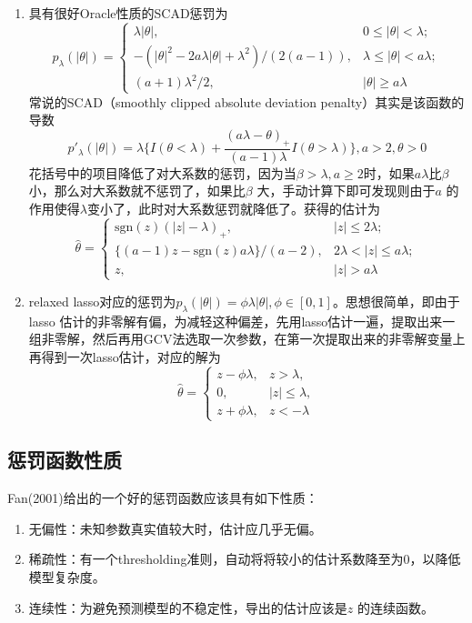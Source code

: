 ﻿\documentclass[hyperref,12pt]{ctexart}
\begin{document}
\begin{enumerate}[(1)]
	\item 具有很好Oracle性质的SCAD惩罚为
	\[
	p_{\lambda}(|\theta|) = \left\{\begin{array}{lr}
	\lambda|\theta|, & 0 \leq |\theta| < \lambda; \\
	-(|\theta|^2 - 2a\lambda|\theta| + \lambda^2)/(2(a - 1)), & \lambda \leq |\theta| < a \lambda; \\
	(a + 1)\lambda^2/2, & |\theta| \geq a\lambda
	\end{array}
	\right.
	\]
	常说的SCAD（smoothly clipped absolute deviation penalty）其实是该函数的导数$$p'_{\lambda}(|\theta|) = \lambda\{I(\theta < \lambda) + \frac{(a\lambda - \theta)_{+}}{(a - 1)\lambda}I(\theta > \lambda) \}, a >2, \theta > 0$$
	花括号中的项目降低了对大系数的惩罚，因为当$\beta > \lambda, a \geq 2$时，如果$a\lambda$比$\beta$小，那么对大系数就不惩罚了，如果比$\beta$ 大，手动计算下即可发现则由于$a$ 的作用使得$\lambda$变小了，此时对大系数惩罚就降低了。获得的估计为
	\[
	\hat{\theta}=\left\{\begin{array}{lr}
	\text{sgn}(z)(|z| - \lambda)_{+}, & |z| \leq 2\lambda; \\
	\{(a - 1)z - \text{sgn}(z)a\lambda\}/(a - 2), & 2\lambda < |z| \leq a \lambda; \\
	z, & |z| > a \lambda
	\end{array}
	\right.
	\]
	\item relaxed lasso对应的惩罚为$p_{\lambda}(|\theta|) = \phi\lambda|\theta|, \phi \in [0, 1]$。思想很简单，即由于lasso 估计的非零解有偏，为减轻这种偏差，先用lasso估计一遍，提取出来一组非零解，然后再用GCV法选取一次参数，在第一次提取出来的非零解变量上再得到一次lasso估计，对应的解为
	\[
	\hat{\theta} = \left\{\begin{array}{lr}
	z - \phi\lambda, & z > \lambda, \\
	0, & |z| \leq \lambda, \\
	z + \phi\lambda, & z < -\lambda
	\end{array}
	\right.
	\]	
\end{enumerate}

\subsection{惩罚函数性质}
Fan(2001)给出的一个好的惩罚函数应该具有如下性质：
\begin{enumerate}[(1)]
	\item 无偏性：未知参数真实值较大时，估计应几乎无偏。
	\item 稀疏性：有一个thresholding准则，自动将将较小的估计系数降至为0，以降低模型复杂度。
	\item 连续性：为避免预测模型的不稳定性，导出的估计应该是$z$ 的连续函数。
\end{enumerate}
\end{document}
